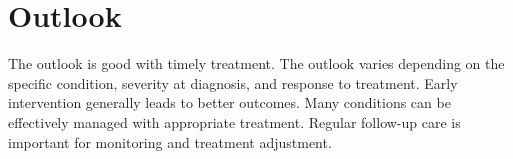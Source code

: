 \section{Outlook}
The outlook is good with timely treatment. The outlook varies depending on the specific condition, severity at diagnosis, and response to treatment. Early intervention generally leads to better outcomes. Many conditions can be effectively managed with appropriate treatment. Regular follow-up care is important for monitoring and treatment adjustment.
